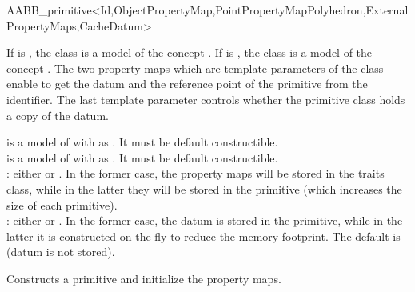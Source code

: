 
\begin{ccRefClass}{AABB_primitive<Id,ObjectPropertyMap,PointPropertyMapPolyhedron,ExternalPropertyMaps,CacheDatum>}


\ccDefinition
  
If  is , the class is a model of the concept .
If  is , the class is a model of the concept .
The two property maps which are template parameters of the class enable to get the datum and the reference point of 
the primitive from the identifier. The last template parameter controls whether the primitive class holds a copy of the datum.


\ccParameters
{} is a model of 
with  as . It must be default constructible.\\
 is a model of 
with  as . It must be default constructible.\\
: either  or . In the former case, the property maps will be stored in the traits class, while in the latter they will be stored in the primitive (which increases the size of each primitive).\\
: either  or . In the former case, the datum is stored in the primitive, while in the latter it is constructed on the fly to reduce
the memory footprint. The default is  (datum is not stored).


\ccTypes

\ccGlue
{}
\ccGlue
{}
  
\ccCreation
{}

{Constructs a primitive and initialize the property maps.}
  

\end{ccRefClass}
